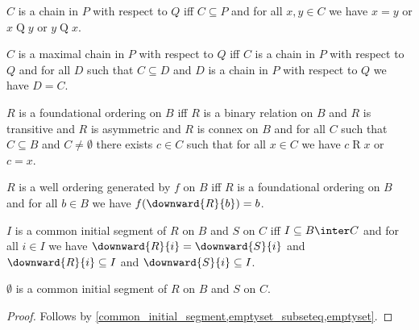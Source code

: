 \begin{definition}\label{chain_in_relation}
    $C$ is a chain in $P$ with respect to $Q$ iff
        $C\subseteq P$ and
        for all $x,y\in C$ we have $x = y$ or $x\mathrel{Q}y$ or $y\mathrel{Q}x$.
\end{definition}

\begin{definition}\label{maximal_chain_in_relation}
    $C$ is a maximal chain in $P$ with respect to $Q$ iff
        $C$ is a chain in $P$ with respect to $Q$ and
        for all $D$ such that $C\subseteq D$ and $D$ is a chain in $P$ with respect to $Q$
            we have $D = C$.
\end{definition}

\begin{definition}\label{foundational_ordering}
    $R$ is a foundational ordering on $B$ iff
        $R$ is a binary relation on $B$ and
        $R$ is transitive and
        $R$ is asymmetric and
        $R$ is connex on $B$ and
        for all $C$ such that $C\subseteq B$ and $C\neq\emptyset$
            there exists $c\in C$ such that for all $x\in C$ we have $c\mathrel{R}x$ or $c = x$.
\end{definition}

\begin{definition}\label{generated_well_ordering}
    $R$ is a well ordering generated by $f$ on $B$ iff
        $R$ is a foundational ordering on $B$ and
        for all $b\in B$ we have $f(\downward{R}{b}) = b$.
\end{definition}

\begin{definition}\label{common_initial_segment}
    $I$ is a common initial segment of $R$ on $B$ and $S$ on $C$ iff
        $I\subseteq B\inter C$ and
        for all $i\in I$ we have
            $\downward{R}{i} = \downward{S}{i}$ and
            $\downward{R}{i}\subseteq I$ and
            $\downward{S}{i}\subseteq I$.
\end{definition}

\begin{lemma}\label{empty_common_initial_segment}
    $\emptyset$ is a common initial segment of $R$ on $B$ and $S$ on $C$.
\end{lemma}
\begin{proof}
    Follows by \cref{common_initial_segment,emptyset_subseteq,emptyset}.
\end{proof}

